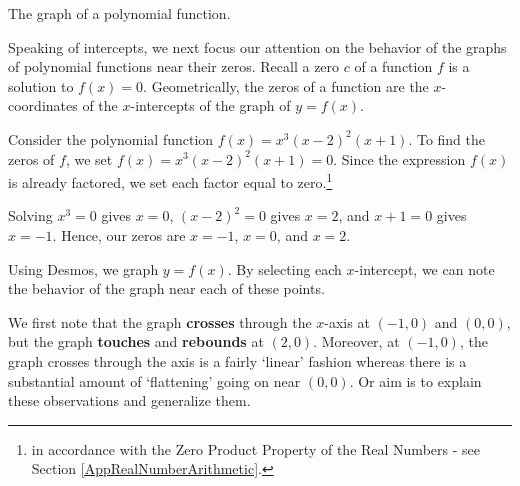\documentclass{ximera}
\begin{document}
\begin{center}
\begin{image}
\end{image}
The graph of a polynomial function.
\end{center}

Speaking of intercepts,  we next focus our attention on the behavior of the graphs of polynomial functions near their zeros.    Recall a zero $c$ of a function $f$ is a solution to $f(x) = 0$.  Geometrically, the zeros of a function are the $x$-coordinates of the $x$-intercepts of the graph of $y = f(x)$.    


Consider the polynomial function $f(x) = x^3 (x-2)^2 (x+1)$. To find the zeros of $f$, we set $f(x) =  x^3 (x-2)^2 (x+1) = 0$.  Since the expression $f(x)$ is already factored, we set each factor equal to zero.\footnote{in accordance with the Zero Product Property of the Real Numbers - see Section \ref{AppRealNumberArithmetic}.}  


Solving $x^3 = 0$ gives $x = 0$, $(x-2)^2 = 0$ gives $x = 2$, and $x+1 = 0$ gives $x = -1$.  Hence, our zeros are $x = -1$, $x = 0$, and $x = 2$.  


Using Desmos, we graph $y = f(x)$.  By selecting each $x$-intercept, we can note the behavior of the graph near each of these points.

\begin{center}
\end{center}


  We first note that the graph \textbf{crosses} through the $x$-axis at $(-1,0)$ and $(0,0)$, but the graph \textbf{touches} and \textbf{rebounds} at $(2,0)$.  Moreover, at $(-1,0)$, the graph crosses through the axis is a fairly `linear' fashion whereas there is a substantial amount of `flattening' going on near $(0,0)$.  Or aim is to explain these observations and generalize them.
\end{document}
